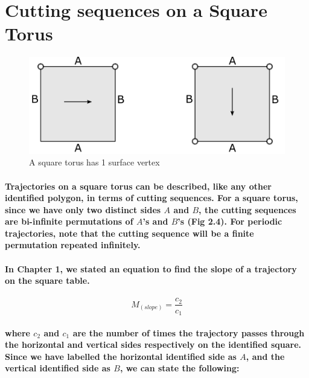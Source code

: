 \documentclass{report}
\begin{document}
\section{Cutting sequences on a Square Torus}


\begin{figure} 
\begin{center}
\includegraphics[scale=0.3]{2.3}
\caption{ A square torus has 1 surface vertex}
\end{center}
\end{figure}


\paragraph{Trajectories on a square torus can be described, like any other identified polygon, in terms of cutting sequences. For a square torus, since we have only two distinct sides $A$ and $B$, the cutting sequences are bi-infinite permutations of $A$’s and $B$’s (Fig 2.4). For periodic trajectories, note that the cutting sequence will be a finite permutation repeated infinitely.}



\paragraph{In Chapter 1, we stated an equation to find the slope of a trajectory on the square table.}


\begin{displaymath}
{M_{(slope)}=\frac{c_{2}}{c_{1}}}
\end{displaymath}


\pagebreak

\paragraph{where $c_{2}$ and $c_{1}$ are the number of times the trajectory passes through the horizontal and vertical sides respectively on the identified square. Since we have labelled the horizontal identified side as $A$, and the vertical identified side as $B$, we can state the following:}
\end{document}
